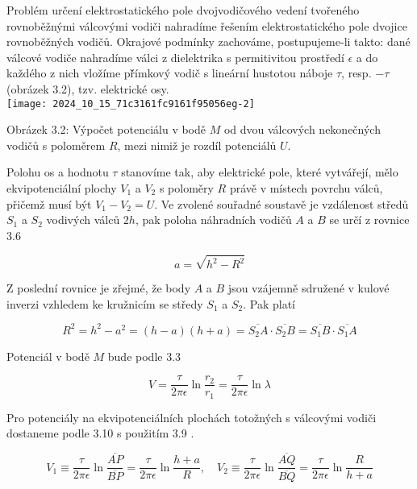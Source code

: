 \documentclass[10pt]{article}
\begin{document}
Problém určení elektrostatického pole dvojvodičového vedení tvořeného rovnoběžnými válcovými vodiči nahradíme řešením elektrostatického pole dvojice rovnoběžných vodičů. Okrajové podmínky zachováme, postupujeme-li takto: dané válcové vodiče nahradíme válci z dielektrika s permitivitou prostředí $\epsilon$ a do každého z nich vložíme př̌ímkový vodič s lineární hustotou náboje $\tau$, resp. $-\tau$ (obrázek 3.2), tzv. elektrické osy.\\
\texttt{[image: 2024\_10\_15\_71c3161fc9161f95056eg-2]}

Obrázek 3.2: Výpočet potenciálu v bodě $M$ od dvou válcových nekonečných vodičů s poloměrem $R$, mezi nimiž je rozdíl potenciálů $U$.

Polohu os a hodnotu $\tau$ stanovíme tak, aby elektrické pole, které vytvářejí, mělo ekvipotenciální plochy $V_{1}$ a $V_{2}$ s poloměry $R$ právě v místech povrchu válců, přičemž musí být $V_{1}-V_{2}=U$. Ve zvolené souřadné soustavě je vzdálenost středů $S_{1}$ a $S_{2}$ vodivých válců $2 h$, pak poloha náhradních vodičů $A$ a $B$ se určí z rovnice 3.6


\begin{equation*}
a=\sqrt{h^{2}-R^{2}} \tag{3.8}
\end{equation*}


Z poslední rovnice je zřejmé, že body $A$ a $B$ jsou vzájemně sdružené v kulové inverzi vzhledem ke kružnicím se středy $S_{1}$ a $S_{2}$. Pak platí


\begin{equation*}
R^{2}=h^{2}-a^{2}=(h-a)(h+a)=\overline{S_{2} A} \cdot \overline{S_{2} B}=\overline{S_{1} B} \cdot \overline{S_{1} A} \tag{3.9}
\end{equation*}


Potenciál v bodě $M$ bude podle 3.3


\begin{equation*}
V=\frac{\tau}{2 \pi \epsilon} \ln \frac{r_{2}}{r_{1}}=\frac{\tau}{2 \pi \epsilon} \ln \lambda \tag{3.10}
\end{equation*}


Pro potenciály na ekvipotenciálních plochách totožných s válcovými vodiči dostaneme podle 3.10 s použitím 3.9 .


\begin{equation*}
V_{1} \equiv \frac{\tau}{2 \pi \epsilon} \ln \frac{\overline{A P}}{\overline{B P}}=\frac{\tau}{2 \pi \epsilon} \ln \frac{h+a}{R}, \quad V_{2} \equiv \frac{\tau}{2 \pi \epsilon} \ln \frac{\overline{A Q}}{\overline{B Q}}=\frac{\tau}{2 \pi \epsilon} \ln \frac{R}{h+a} \tag{3.11}
\end{equation*}
\end{document}
